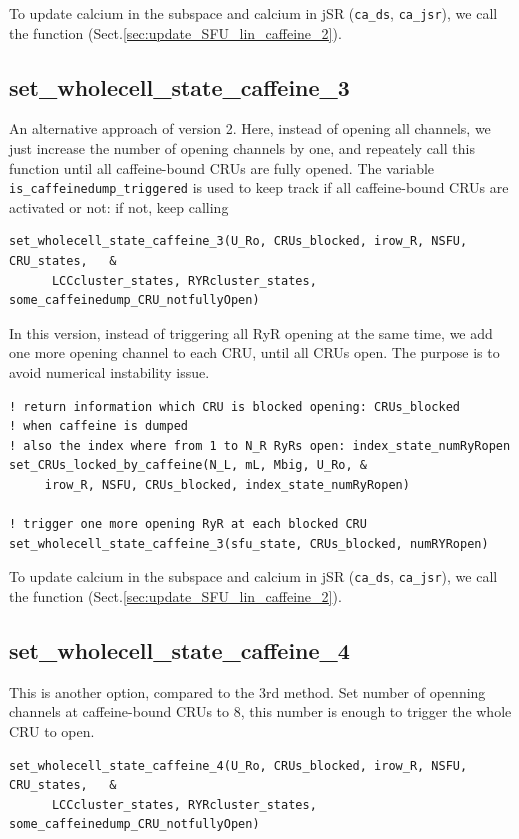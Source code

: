 To update calcium in the subspace and calcium in jSR (\verb!ca_ds!,
\verb!ca_jsr!), we call the function (Sect.\ref{sec:update_SFU_lin_caffeine_2}). 

\subsection{set\_wholecell\_state\_caffeine\_3}
\label{sec:set_wholecell_state_caffeine_3}

An alternative approach of version 2. Here, instead of opening all channels, we
just increase the number of opening channels by one, and repeately call this
function until all caffeine-bound CRUs are fully opened.
The variable \verb!is_caffeinedump_triggered! is used to keep track if all
caffeine-bound CRUs are activated or not: if not, keep calling
\begin{verbatim}
set_wholecell_state_caffeine_3(U_Ro, CRUs_blocked, irow_R, NSFU, CRU_states,   &
      LCCcluster_states, RYRcluster_states, some_caffeinedump_CRU_notfullyOpen)
\end{verbatim}
In this version, instead of triggering all RyR opening at the same time, we
add one more opening channel to each CRU, until all CRUs open. The purpose is to
avoid numerical instability issue.
\begin{verbatim}
! return information which CRU is blocked opening: CRUs_blocked
! when caffeine is dumped
! also the index where from 1 to N_R RyRs open: index_state_numRyRopen
set_CRUs_locked_by_caffeine(N_L, mL, Mbig, U_Ro, &
     irow_R, NSFU, CRUs_blocked, index_state_numRyRopen)

! trigger one more opening RyR at each blocked CRU
set_wholecell_state_caffeine_3(sfu_state, CRUs_blocked, numRYRopen)

\end{verbatim} 
 
To update calcium in the subspace and calcium in jSR (\verb!ca_ds!,
\verb!ca_jsr!), we call the function (Sect.\ref{sec:update_SFU_lin_caffeine_2}). 

\subsection{set\_wholecell\_state\_caffeine\_4}
\label{sec:set_wholecell_state_caffeine_4}

This is another option, compared to the 3rd method. Set number of openning
channels at caffeine-bound CRUs to 8, this number is enough to trigger the whole
CRU to open. 
\begin{verbatim}
set_wholecell_state_caffeine_4(U_Ro, CRUs_blocked, irow_R, NSFU, CRU_states,   &
      LCCcluster_states, RYRcluster_states, some_caffeinedump_CRU_notfullyOpen)
\end{verbatim}
  
